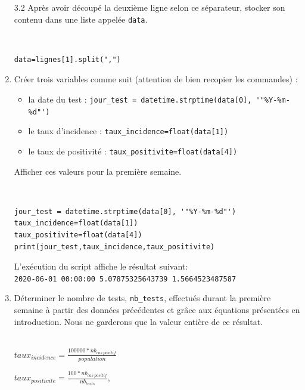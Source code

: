 \begin{enumerate}
\item[3.2] Après avoir découpé la deuxième ligne selon ce séparateur, stocker son contenu dans une liste appelée \verb?data?. 

 \begin{solution}~\ \\
\begin{verbatim}
data=lignes[1].split(",")
 \end{verbatim}
\end{solution}

\setcounter{enumi}{3}
\item Créer trois variables comme suit (attention de bien recopier les commandes) :
\begin{itemize}
 \item la date du test : \verb?jour_test = datetime.strptime(data[0], '"%Y-%m-%d"')?
 \item le taux d'incidence : \verb?taux_incidence=float(data[1])?
 \item le taux de positivité : \verb?taux_positivite=float(data[4])?
\end{itemize}

Afficher ces valeurs pour la première semaine.

 \begin{solution}~\ \\
\begin{verbatim}
jour_test = datetime.strptime(data[0], '"%Y-%m-%d"')
taux_incidence=float(data[1])
taux_positivite=float(data[4])
print(jour_test,taux_incidence,taux_positivite)
 \end{verbatim}
\end{solution}

L'exécution du script affiche le résultat suivant:\\
\verb?2020-06-01 00:00:00 5.07875325643739 1.5664523487587?

\item Déterminer le nombre de tests, \verb?nb_tests?, effectués durant la première semaine à partir des données précédentes et grâce aux équations présentées en introduction. Nous ne garderons que la valeur entière de ce résultat.

 \begin{solution}~\ \\
$taux_{incidence}=\frac{100000*nb_{cas\ positif}}{population}$

$taux_{positivite}=\frac{100*nb_{cas\ positif}}{nb_{tests}}$,


\end{solution}
\end{enumerate}
